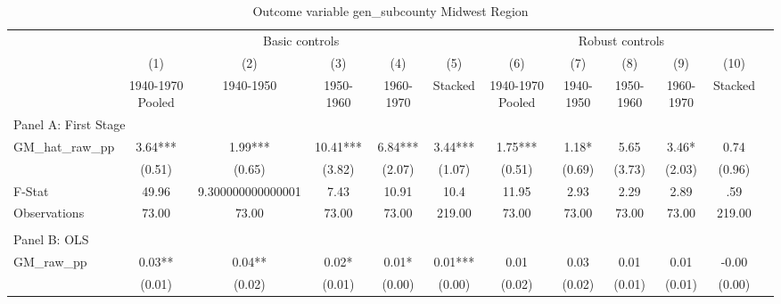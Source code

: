  \begin{table}[htbp]\centering {} \begin{threeparttable} \caption{Outcome variable gen\_subcounty Midwest Region} \begin{tabular}{l*{11}{c}} \toprule
          &\multicolumn{5}{c}{Basic controls}                                   &\multicolumn{5}{c}{Robust controls}                                  \\\cmidrule(lr){2-6}\cmidrule(lr){7-11}
          &\multicolumn{1}{c}{(1)}&\multicolumn{1}{c}{(2)}&\multicolumn{1}{c}{(3)}&\multicolumn{1}{c}{(4)}&\multicolumn{1}{c}{(5)}&\multicolumn{1}{c}{(6)}&\multicolumn{1}{c}{(7)}&\multicolumn{1}{c}{(8)}&\multicolumn{1}{c}{(9)}&\multicolumn{1}{c}{(10)}\\
          &\multicolumn{1}{c}{1940-1970 Pooled}&\multicolumn{1}{c}{1940-1950}&\multicolumn{1}{c}{1950-1960}&\multicolumn{1}{c}{1960-1970}&\multicolumn{1}{c}{Stacked}&\multicolumn{1}{c}{1940-1970 Pooled}&\multicolumn{1}{c}{1940-1950}&\multicolumn{1}{c}{1950-1960}&\multicolumn{1}{c}{1960-1970}&\multicolumn{1}{c}{Stacked}\\
\cmidrule(lr){1-11}
\multicolumn{10}{l}{Panel A: First Stage}\\
\cmidrule(lr){1-11}
GM\_hat\_raw\_pp&      3.64***&      1.99***&     10.41***&      6.84***&      3.44***&      1.75***&      1.18*  &      5.65   &      3.46*  &      0.74   \\
          &    (0.51)   &    (0.65)   &    (3.82)   &    (2.07)   &    (1.07)   &    (0.51)   &    (0.69)   &    (3.73)   &    (2.03)   &    (0.96)   \\
\midrule
F-Stat    &     49.96   &9.300000000000001   &      7.43   &     10.91   &      10.4   &     11.95   &      2.93   &      2.29   &      2.89   &       .59   \\
Observations&     73.00   &     73.00   &     73.00   &     73.00   &    219.00   &     73.00   &     73.00   &     73.00   &     73.00   &    219.00   \\
\cmidrule[\heavyrulewidth](lr){1-11} \\ \cmidrule[\heavyrulewidth](lr){1-11}
\multicolumn{10}{l}{Panel B: OLS}\\
\cmidrule(lr){1-11}
GM\_raw\_pp &      0.03** &      0.04** &      0.02*  &      0.01*  &      0.01***&      0.01   &      0.03   &      0.01   &      0.01   &     -0.00   \\
          &    (0.01)   &    (0.02)   &    (0.01)   &    (0.00)   &    (0.00)   &    (0.02)   &    (0.02)   &    (0.01)   &    (0.01)   &    (0.00)   \\

\end{tabular}
\end{threeparttable}
\end{table}
